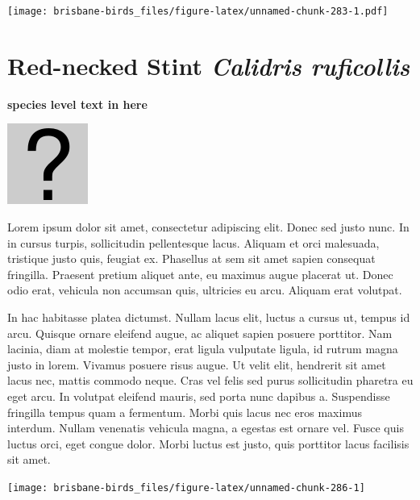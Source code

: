 \documentclass[]{book}
\let\origfigure\figure
\let\endorigfigure\endfigure
\renewenvironment{figure}[1][2] {
  \expandafter\origfigure\expandafter[H]
} {
  \endorigfigure
}
\begin{document}
\begin{figure}
\centering
\texttt{[image: brisbane-birds\_files/figure-latex/unnamed-chunk-283-1.pdf]}
\caption{\label{fig:unnamed-chunk-283}insert figure caption}
\end{figure}

\section{\texorpdfstring{Red-necked Stint \emph{Calidris
ruficollis}}{Red-necked Stint Calidris ruficollis}}\label{red-necked-stint-calidris-ruficollis}

\textbf{species level text in here}

\begin{figure}
\centering
\includegraphics{assets/missing.png}
\caption{No image for species}
\end{figure}

Lorem ipsum dolor sit amet, consectetur adipiscing elit. Donec sed justo
nunc. In in cursus turpis, sollicitudin pellentesque lacus. Aliquam et
orci malesuada, tristique justo quis, feugiat ex. Phasellus at sem sit
amet sapien consequat fringilla. Praesent pretium aliquet ante, eu
maximus augue placerat ut. Donec odio erat, vehicula non accumsan quis,
ultricies eu arcu. Aliquam erat volutpat.

In hac habitasse platea dictumst. Nullam lacus elit, luctus a cursus ut,
tempus id arcu. Quisque ornare eleifend augue, ac aliquet sapien posuere
porttitor. Nam lacinia, diam at molestie tempor, erat ligula vulputate
ligula, id rutrum magna justo in lorem. Vivamus posuere risus augue. Ut
velit elit, hendrerit sit amet lacus nec, mattis commodo neque. Cras vel
felis sed purus sollicitudin pharetra eu eget arcu. In volutpat eleifend
mauris, sed porta nunc dapibus a. Suspendisse fringilla tempus quam a
fermentum. Morbi quis lacus nec eros maximus interdum. Nullam venenatis
vehicula magna, a egestas est ornare vel. Fusce quis luctus orci, eget
congue dolor. Morbi luctus est justo, quis porttitor lacus facilisis sit
amet.

\begin{figure}
\texttt{[image: brisbane-birds\_files/figure-latex/unnamed-chunk-286-1]} \caption{insert figure caption}\label{fig:unnamed-chunk-286}
\end{figure}
\end{document}
